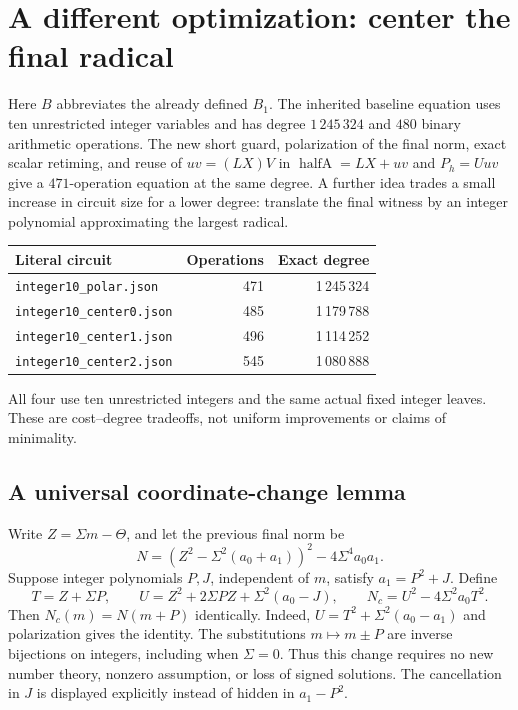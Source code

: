 \section{A different optimization: center the final radical}
Here $B$ abbreviates the already defined $B_1$.
The inherited baseline equation uses ten unrestricted integer variables and has degree
$1\,245\,324$ and $480$ binary arithmetic operations.  The new short guard,
polarization of the final norm, exact scalar retiming, and reuse of
$uv=(LX)V$ in $\operatorname{halfA}=LX+uv$
and $P_h=Uuv$ give a
$471$-operation equation at the same degree.  A further idea trades a small
increase in circuit size for a lower degree: translate the final witness by
an integer polynomial approximating the largest radical.

\begin{center}
\begin{tabular}{lrr}
Literal circuit & Operations & Exact degree\\\hline
\texttt{integer10\_polar.json}&471&1\,245\,324\\
\texttt{integer10\_center0.json}&485&1\,179\,788\\
\texttt{integer10\_center1.json}&496&1\,114\,252\\
\texttt{integer10\_center2.json}&545&1\,080\,888
\end{tabular}
\end{center}
All four use ten unrestricted integers and the same actual fixed integer
leaves. These are cost--degree tradeoffs, not uniform improvements or claims
of minimality.

\subsection{A universal coordinate-change lemma}
Write $Z=\Sigma m-\Theta$, and let the previous final norm be
\[
 N=(Z^2-\Sigma^2(a_0+a_1))^2-4\Sigma^4a_0a_1.
\]
Suppose integer polynomials $P,J$, independent of $m$, satisfy $a_1=P^2+J$.
Define
\[
 T=Z+\Sigma P,\qquad
 U=Z^2+2\Sigma PZ+\Sigma^2(a_0-J),\qquad
 N_c=U^2-4\Sigma^2a_0T^2.
\]
Then $N_c(m)=N(m+P)$ identically. Indeed,
$U=T^2+\Sigma^2(a_0-a_1)$ and polarization gives the identity.
The substitutions $m\mapsto m\pm P$ are inverse bijections on integers,
including when $\Sigma=0$. Thus this change requires no new number theory,
nonzero assumption, or loss of signed solutions. The cancellation in $J$
is displayed explicitly instead of hidden in $a_1-P^2$.

